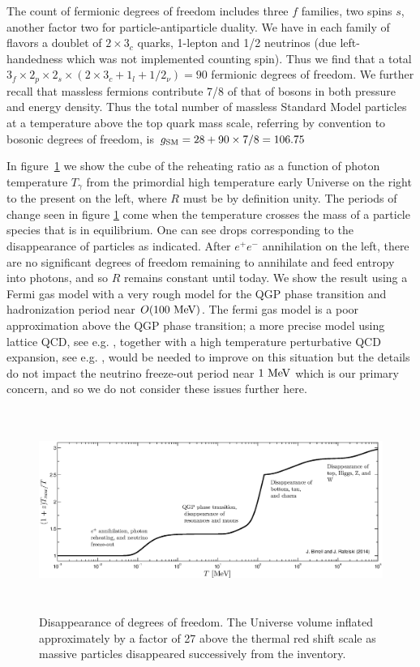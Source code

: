 The count of fermionic degrees of freedom includes three $f$ families, two spins $s$, another factor two for particle-antiparticle duality. We have in each family of flavors a doublet of $2\times 3_c$ quarks, 1-lepton and 1/2 neutrinos (due left-handedness which was not implemented counting spin). Thus we find that a total $3_f\times 2_p\times 2_s\times(2\times 3_c+1_l+1/2_\nu)=90$ fermionic degrees of freedom. We further recall that massless fermions contribute 7/8 of that of bosons in both pressure and energy density. Thus the total number of massless Standard Model particles at a temperature above the top quark mass scale, referring by convention to bosonic degrees of freedom, is $g_{\rm SM}=28+90\times 7/8=106.75$ 



In figure~\ref{fig:dof}  we show the cube of the reheating ratio  as a function of photon temperature $T_\gamma$ from the primordial high temperature  early Universe on the right to the present on the left, where $R$  must be by definition unity.  The periods of change seen in figure \ref{fig:dof} come when the temperature crosses the mass of a particle species that is in equilibrium. One can see drops corresponding to the disappearance of particles as indicated.   After $e^+e^-$ annihilation on the left, there are no significant degrees of freedom remaining to annihilate and feed entropy into photons, and so $R$  remains constant until today. We show the result using a Fermi gas model with a very rough model for the QGP phase transition and hadronization period near $O(100\text{ MeV})$. The fermi gas model is a poor approximation above the QGP phase transition; a more precise model using lattice QCD, see e.g. \cite{Borsanyi:2013bia}, together with a high temperature perturbative QCD expansion, see e.g. \cite{letessier2002hadrons}, would be needed to improve on this situation but the details do not impact the neutrino freeze-out period near $1\text{ MeV}$ which is our primary concern, and so we do not consider these issues further here.

\begin{figure} 
\centerline{\hspace*{0.4cm}\includegraphics[height=6.6cm]{03-birrell/ErasOfUniverse/z_T_plot.eps}}
\caption{Disappearance of degrees of freedom. The Universe volume inflated approximately by a factor of 27 above the thermal red shift scale as massive particles disappeared successively from the inventory.\label{fig:dof}}
 \end{figure}



